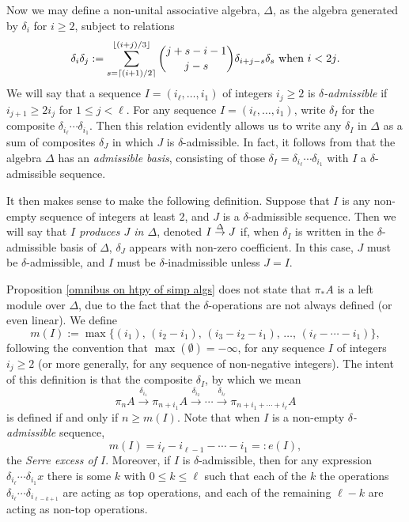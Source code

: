 \documentclass[11pt]{amsart}
\theoremstyle{plain}
\theoremstyle{definition}
\renewcommand{\to}{\longrightarrow}
\theoremstyle{plain}
\newcommand{\deltaalg}{\Delta} %
\newcommand{\minDimDelta}{m}
\newcommand{\produces}[3]{#3:#1\sim #2}
\renewcommand{\produces}[3]{#1\rightarrow_{#3} #2}%
\renewcommand{\produces}[3]{#1\overset{\smash{#3}}{\rightarrow} #2}%
\begin{document}
\begin{Constructing (co)homotopy operations}
Now we may define a non-unital associative algebra, $\deltaalg$, as the algebra generated by $\delta_i$ for $i\geq2$, subject to relations
\[\delta_i\delta_j:=\sum_{s=\lceil(i+1)/2\rceil}^{\lfloor(i+j)/3\rfloor}{j+s-i-1\choose j-s}\delta_{i+j-s}\delta_s\textup{ when $i<2j$}.\]
We will say that a sequence $I=(i_\ell,\ldots,i_1)$ of integers $i_j\geq2$ is \emph{$\delta$-admissible} if $i_{j+1}\geq 2i_j$ for $1\leq j <\ell$. For any sequence $I=(i_\ell,\ldots,i_1)$, write $\delta_I$ for the composite $\delta_{i_\ell}\cdots \delta_{i_1}$. Then this relation evidently allows us to write any $\delta_I$ in $\deltaalg$ as a sum of composites $\delta_J$ in which $J$ is $\delta$-admissible. In fact, it follows from \cite[Proposition 2.7]{MR1089001} that the algebra $\deltaalg$ has an \emph{admissible basis}, consisting of those $\delta_I=\delta_{i_\ell}\cdots \delta_{i_{1}}$ with $I$ a $\delta$-admissible sequence. 

It then makes sense to make the following definition. Suppose that $I$ is any non-empty sequence of integers at least $2$, and $J$ is a $\delta$-admissible sequence. Then we will say that \emph{$I$ produces $J$ in $\deltaalg$}, denoted $\produces{I}{J}{\deltaalg}$ if, when $\delta_I$ is written in the $\delta$-admissible basis of $\deltaalg$, $\delta_J$ appears with non-zero coefficient. In this case, $J$ must be $\delta$-admissible, and $I$ must be $\delta$-inadmissible unless $J=I$.

Proposition \ref{omnibus on htpy of simp algs} does not state that $\pi_*A$ is a left module over $\deltaalg$, due to the fact that the $\delta$-operations are not always defined (or even linear). We define
\[\minDimDelta(I):=\max\{(i_1),\,(i_2-i_1),\,(i_3-i_2-i_1),\,\ldots,\,(i_{\ell}-\cdots-i_1)\},
\]
following the convention that $\max(\emptyset)=-\infty$, for any sequence $I$ of integers $i_j\geq2$ (or more generally, for any sequence of non-negative integers).  The intent of this definition is that the composite $\delta_I$, by which we mean
\[\pi_{n}A\overset{\delta_{i_1}}{\to}\pi_{n+i_1}A\overset{\delta_{i_2}}{\to}\cdots \overset{\delta_{i_\ell}}{\to}\pi_{n+i_1+\cdots +i_\ell}A\]
is defined if and only if $n\geq \minDimDelta(I)$. 
Note that when $I$ is a non-empty \emph{$\delta$-admissible} sequence,
\[\minDimDelta(I)=i_{\ell}-i_{\ell-1}-\cdots -i_1=:e(I),\]
the \emph{Serre excess of $I$}. Moreover, if $I$ is $\delta$-admissible, then for any expression $\delta_{i_{\ell}}\cdots \delta_{i_{1}}x$ there is some $k$ with $0\leq k\leq \ell$ such that each of the $k$ the operations $\delta_{i_{\ell}}\cdots \delta_{i_{\ell-k+1}}$ are acting as top operations, and each of the remaining $\ell-k$ are acting as non-top operations.


\end{Constructing (co)homotopy operations}
\end{document}
